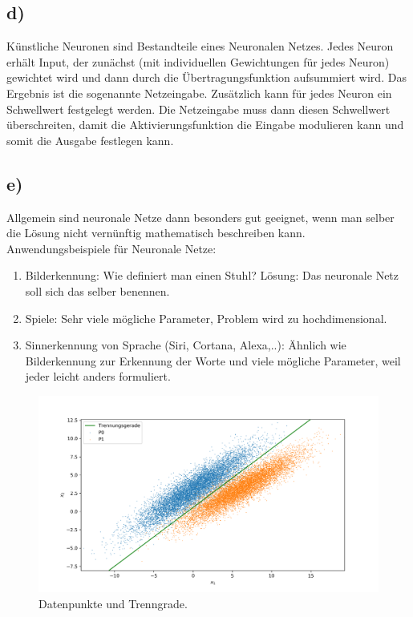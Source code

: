 \documentclass[a4paper, 11pt]{article}
\begin{document}
\subsection*{d)}
Künstliche Neuronen sind Bestandteile eines Neuronalen Netzes. Jedes Neuron erhält
Input, der zunächst (mit individuellen Gewichtungen für jedes Neuron) gewichtet
wird und dann durch die Übertragungsfunktion aufsummiert wird. Das Ergebnis ist
die sogenannte Netzeingabe. Zusätzlich kann für jedes Neuron ein Schwellwert
festgelegt werden. Die Netzeingabe muss dann diesen Schwellwert überschreiten,
damit die Aktivierungsfunktion die Eingabe modulieren kann und somit die Ausgabe
festlegen kann.

\subsection*{e)}
Allgemein sind neuronale Netze dann besonders gut geeignet, wenn man selber die Lösung
nicht vernünftig mathematisch beschreiben kann.
Anwendungsbeispiele für Neuronale Netze:
\begin{enumerate}
  \item Bilderkennung: Wie definiert man einen Stuhl? Lösung: Das neuronale Netz soll sich
  das selber benennen.
  \item Spiele: Sehr viele mögliche Parameter, Problem wird zu hochdimensional.
  \item Sinnerkennung von Sprache (Siri, Cortana, Alexa,..): Ähnlich wie Bilderkennung zur Erkennung der Worte und viele mögliche Parameter, weil jeder leicht anders formuliert.
\end{enumerate}

\FloatBarrier

\begin{figure}
    \centering
    \includegraphics[width=\textwidth]{../A22/A22.png}
    \caption{Datenpunkte und Trenngrade.}
\end{figure}
\end{document}
